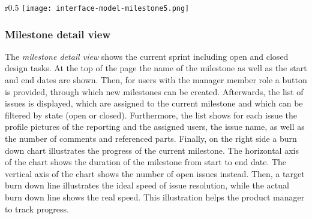 \begin{wrapfigure}{r}{0.5\textwidth}
    \centering
    \texttt{[image: interface-model-milestone5.png]}
    \label{fig:screenshot-milestone}
\end{wrapfigure}

\subsubsection{Milestone detail view}

The \textit{milestone detail view} shows the current sprint including open and closed design tasks.
At the top of the page the name of the milestone as well as the start and end dates are shown.
Then, for users with the manager member role a button is provided, through which new milestones can be created.
Afterwards, the list of issues is displayed, which are assigned to the current milestone and which can be filtered by state (open or closed).
Furthermore, the list shows for each issue the profile pictures of the reporting and the assigned users, the issue name, as well as the number of comments and referenced parts.
Finally, on the right side a burn down chart illustrates the progress of the current milestone.
The horizontal axis of the chart shows the duration of the milestone from start to end date.
The vertical axis of the chart shows the number of open issues instead.
Then, a target burn down line illustrates the ideal speed of issue resolution, while the actual burn down line shows the real speed.
This illustration helps the product manager to track progress.